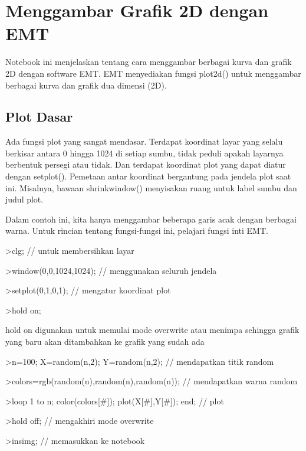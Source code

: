 \documentclass[
]{book}
\author{}
\date{}
\begin{document}
\frontmatter

\mainmatter
\chapter{Menggambar Grafik 2D dengan EMT}\label{menggambar-grafik-2d-dengan-emt}

Notebook ini menjelaskan tentang cara menggambar berbagai kurva dan grafik 2D dengan software EMT. EMT menyediakan fungsi plot2d() untuk menggambar berbagai kurva dan grafik dua dimensi (2D).

\section{Plot Dasar}\label{plot-dasar}

Ada fungsi plot yang sangat mendasar. Terdapat koordinat layar yang selalu berkisar antara 0 hingga 1024 di setiap sumbu, tidak peduli apakah layarnya berbentuk persegi atau tidak. Dan terdapat koordinat plot yang dapat diatur dengan setplot(). Pemetaan antar koordinat bergantung pada jendela plot saat ini. Misalnya, bawaan shrinkwindow() menyisakan ruang untuk label sumbu dan judul plot.

Dalam contoh ini, kita hanya menggambar beberapa garis acak dengan berbagai warna. Untuk rincian tentang fungsi-fungsi ini, pelajari fungsi inti EMT.

\textgreater clg; // untuk membersihkan layar

\textgreater window(0,0,1024,1024); // menggunakan seluruh jendela

\textgreater setplot(0,1,0,1); // mengatur koordinat plot

\textgreater hold on;

hold on digunakan untuk memulai mode overwrite atau menimpa sehingga grafik yang baru akan ditambahkan ke grafik yang sudah ada

\textgreater n=100; X=random(n,2); Y=random(n,2); // mendapatkan titik random

\textgreater colors=rgb(random(n),random(n),random(n)); // mendapatkan warna random

\textgreater loop 1 to n; color(colors{[}\#{]}); plot(X{[}\#{]},Y{[}\#{]}); end; // plot

\textgreater hold off; // mengakhiri mode overwrite

\textgreater insimg; // memasukkan ke notebook
\end{document}
